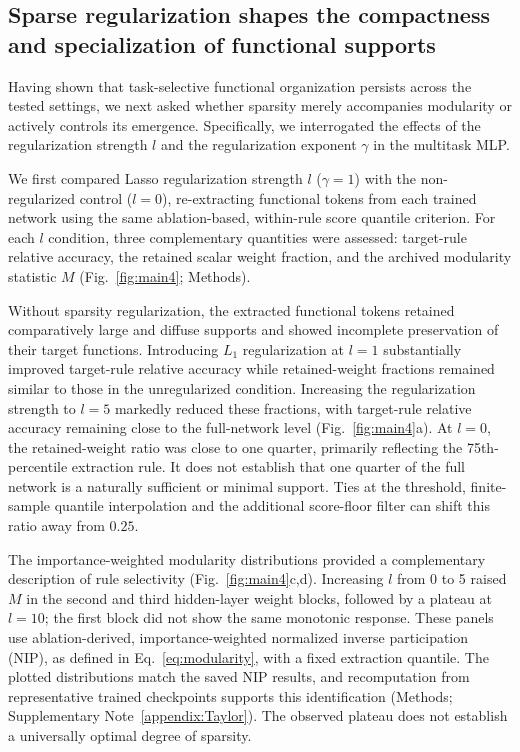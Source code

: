 \documentclass{article}
\begin{document}
\subsection{Sparse regularization shapes the compactness and specialization of functional supports}

Having shown that task-selective functional organization persists across the tested settings, we next asked whether sparsity merely accompanies modularity or actively controls its emergence. Specifically, we interrogated the effects of the regularization strength $l$ and the regularization exponent $\gamma$ in the multitask MLP.

We first compared Lasso regularization strength \(l\) (\(\gamma = 1\)) with the non-regularized control (\(l = 0\)), re-extracting functional tokens from each trained network using the same ablation-based, within-rule score quantile criterion. For each \(l\) condition, three complementary quantities were assessed: target-rule relative accuracy, the retained scalar weight fraction, and the archived modularity statistic $M$ (Fig.~\ref{fig:main4}; Methods).

Without sparsity regularization, the extracted functional tokens retained comparatively large and diffuse supports and showed incomplete preservation of their target functions. Introducing \(L_{1}\) regularization at \(l = 1\) substantially improved target-rule relative accuracy while retained-weight fractions remained similar to those in the unregularized condition. Increasing the regularization strength to \(l = 5\) markedly reduced these fractions, with target-rule relative accuracy remaining close to the full-network level (Fig.~\ref{fig:main4}a). At $l=0$, the retained-weight ratio was close to one quarter, primarily reflecting the 75th-percentile extraction rule. It does not establish that one quarter of the full network is a naturally sufficient or minimal support. Ties at the threshold, finite-sample quantile interpolation and the additional score-floor filter can shift this ratio away from $0.25$.



The importance-weighted modularity distributions provided a complementary description of rule selectivity (Fig.~\ref{fig:main4}c,d). Increasing $l$ from 0 to 5 raised $M$ in the second and third hidden-layer weight blocks, followed by a plateau at $l=10$; the first block did not show the same monotonic response. These panels use ablation-derived, importance-weighted normalized inverse participation (NIP), as defined in Eq.~\eqref{eq:modularity}, with a fixed extraction quantile. The plotted distributions match the saved NIP results, and recomputation from representative trained checkpoints supports this identification (Methods; Supplementary Note~\ref{appendix:Taylor}). The observed plateau does not establish a universally optimal degree of sparsity.
\end{document}
